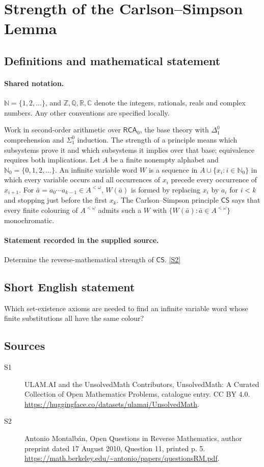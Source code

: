 \documentclass[11pt]{article}
\newcommand{\sref}[2]{\hyperlink{source:#1:#2}{[S#2]}}
\begin{document}
\section{Strength of the Carlson–Simpson Lemma}\label{statement}

\subsection{Definitions and mathematical statement}

\paragraph{Shared notation.}$\mathbb N=\{1,2,\ldots\}$, and $\mathbb Z,\mathbb Q,\mathbb R,\mathbb C$ denote the integers, rationals, reals and complex numbers. Any other conventions are specified locally.


Work in second-order arithmetic over $\mathsf{RCA}_0$, the base theory with $\Delta^0_1$ comprehension and $\Sigma^0_1$ induction. The strength of a principle means which subsystems prove it and which subsystems it implies over that base; equivalence requires both implications. Let $A$ be a finite nonempty alphabet and $\mathbb N_0=\{0,1,2,\ldots\}$. An infinite variable word $W$ is a sequence in $A\cup\{x_i:i\in\mathbb N_0\}$ in which every variable occurs and all occurrences of $x_i$ precede every occurrence of $x_{i+1}$. For $\bar a=a_0\cdots a_{k-1}\in A^{<\omega}$, $W(\bar a)$ is formed by replacing $x_i$ by $a_i$ for $i<k$ and stopping just before the first $x_k$. The Carlson--Simpson principle $\mathsf{CS}$ says that every finite colouring of $A^{<\omega}$ admits such a $W$ with $\{W(\bar a):\bar a\in A^{<\omega}\}$ monochromatic.
\paragraph{Statement recorded in the supplied source.}
Determine the reverse-mathematical strength of $\mathsf{CS}$. \sref{statement}{2}
\subsection{Short English statement}
Which set-existence axioms are needed to find an infinite variable word whose finite substitutions all have the same colour?
\subsection{Sources}
\begin{description}
\item[\hypertarget{source:statement:1}{S1}] ULAM.AI and the UnsolvedMath Contributors, UnsolvedMath: A Curated Collection of Open Mathematics Problems, catalogue entry. CC BY 4.0. \url{https://huggingface.co/datasets/ulamai/UnsolvedMath}.
\item[\hypertarget{source:statement:2}{S2}] Antonio Montalbán, Open Questions in Reverse Mathematics, author preprint dated 17 August 2010, Question 11, printed p. 5. \url{https://math.berkeley.edu/~antonio/papers/questionsRM.pdf}.
\end{description}
\label{end:statement}
\end{document}
